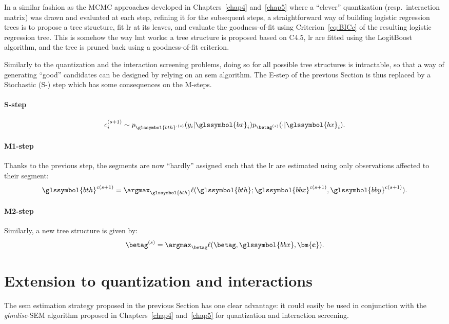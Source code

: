 In a similar fashion as the MCMC approaches developed in Chapters~\ref{chap4} and~\ref{chap5} where a ``clever'' quantization (resp.\ interaction matrix) was drawn and evaluated at each step, refining it for the subsequent steps, a straightforward way of building logistic regression trees is to propose a tree structure, fit \gls{lr} at its leaves, and evaluate the goodness-of-fit using Criterion~\ref{eq:BICc} of the resulting logistic regression tree. This is somehow the way \gls{lmt} works: a tree structure is proposed based on C4.5, \gls{lr} are fitted using the LogitBoost algorithm, and the tree is pruned back using a goodness-of-fit criterion.

Similarly to the quantization and the interaction screening problems, doing so for all possible tree structures is intractable, so that a way of generating ``good'' candidates can be designed by relying on an \gls{sem} algorithm. The E-step of the previous Section is thus replaced by a Stochastic (S-) step which has some consequences on the M-steps.
\paragraph{S-step}
\[ c_i^{(s+1)} \sim p_{\glssymbol{bth}^{\cdot(s)}}(y_i | \glssymbol{bx}_i) p_{\betag^{(s)}}(\cdot | \glssymbol{bx}_i). \]
\paragraph{M1-step} Thanks to the previous step, the segments are now ``hardly'' assigned such that the \gls{lr} are estimated using only observations affected to their segment:
\[ \glssymbol{bth}^{c(s+1)} = \argmax_{\glssymbol{bth}} \ell(\glssymbol{bth};\glssymbol{bbx}^{c(s+1)},\glssymbol{bby}^{c(s+1)}). \]
\paragraph{M2-step} Similarly, a new tree structure is given by:
\[ \betag^{(s)} = \argmax_{\betag} \ell(\betag, \glssymbol{bbx}, \mathbf{\bm{c}}). \]




\section{Extension to quantization and interactions}

The \gls{sem} estimation strategy proposed in the previous Section has one clear advantage: it could easily be used in conjunction with the \textit{glmdisc}-SEM algorithm proposed in Chapters~\ref{chap4} and~\ref{chap5} for quantization and interaction screening.

